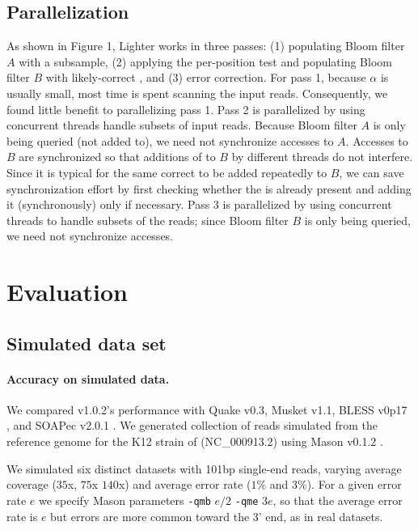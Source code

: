 \documentclass{bmcart}
\begin{document}
\subsection*{Parallelization} 
As shown in Figure 1, Lighter works in three passes: (1) populating Bloom filter $A$ with a \kmer subsample, (2) applying the per-position test and populating Bloom filter $B$ with likely-correct \kmers, and (3) error correction.  For pass 1, because $\alpha$ is usually small, most time is spent scanning the input reads.  Consequently, we found little benefit to parallelizing pass 1.  Pass 2 is parallelized by using concurrent threads handle subsets of input reads.  Because Bloom filter $A$ is only being queried (not added to), we need not synchronize accesses to $A$.  Accesses to $B$ are synchronized so that additions of \kmers to $B$ by different threads do not interfere.  Since it is typical for the same correct \kmer to be added repeatedly to $B$, we can save synchronization effort by first checking whether the \kmer is already present and adding it (synchronously) only if necessary.  Pass 3 is parallelized by using concurrent threads to handle subsets of the reads; since Bloom filter $B$ is only being queried, we need not synchronize accesses.

\section*{Evaluation}
\subsection*{Simulated data set}

\paragraph{Accuracy on simulated data.} We compared \tool v1.0.2's performance  with Quake v0.3\cite{kelley2010quake}, Musket v1.1\cite{liu2013musket}, BLESS v0p17 \cite{heo2014bless}, and SOAPec v2.0.1 \cite{luo2012soapdenovo2} .  We generated collection of reads simulated from the reference genome for the K12 strain of \ecoli (NC\_000913.2) using Mason v0.1.2 \cite{holtgrewe2010mason}.  

We simulated six distinct datasets with 101bp single-end reads, varying average coverage ($35$x, $75$x $140$x) and average error rate ($1\%$ and $3\%$).  For a given error rate $e$ we specify Mason parameters \verb+-qmb+ $e/2$ \verb+-qme+ $3e$, so that the average error rate is $e$ but errors are more common toward the 3' end, as in real datasets.
\end{document}
